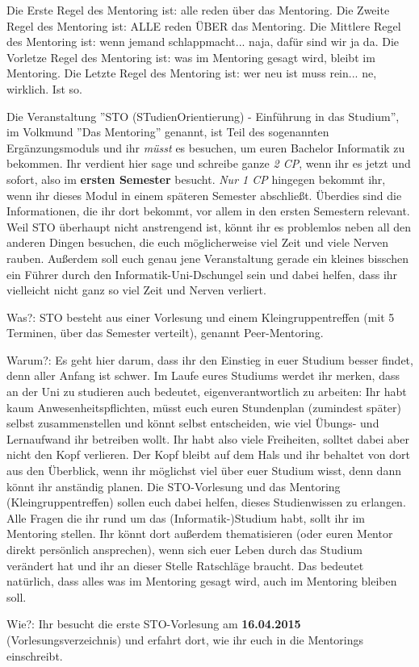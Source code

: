 \spaltenanfang
Die Erste Regel des Mentoring ist: alle reden über das Mentoring.
Die Zweite Regel des Mentoring ist: ALLE reden ÜBER das Mentoring.
Die Mittlere Regel des Mentoring ist: wenn jemand schlappmacht... naja, dafür sind wir ja da.
Die Vorletze Regel des Mentoring ist: was im Mentoring gesagt wird, bleibt im Mentoring.
Die Letzte Regel des Mentoring ist: wer neu ist muss rein... ne, wirklich. Ist so.

Die Veranstaltung ''STO (STudienOrientierung) - Einführung in das Studium'', im Volkmund ''Das Mentoring'' genannt, ist Teil des sogenannten Ergänzungsmoduls und ihr \emph{müsst} es besuchen, um euren Bachelor Informatik zu bekommen. Ihr verdient hier sage und schreibe ganze \emph{2 CP}, wenn ihr es jetzt und sofort, also im \textbf{ersten Semester} besucht. \emph{Nur 1 CP} hingegen bekommt ihr, wenn ihr dieses Modul in einem späteren Semester abschließt. Überdies sind die Informationen, die ihr dort bekommt, vor allem in den ersten Semestern relevant. Weil STO überhaupt nicht anstrengend ist, könnt ihr es problemlos neben all den anderen Dingen besuchen, die euch möglicherweise viel Zeit und viele Nerven rauben. Außerdem soll euch genau jene Veranstaltung gerade ein kleines bisschen ein Führer durch den Informatik-Uni-Dschungel sein und dabei helfen, dass ihr vielleicht nicht ganz so viel Zeit und Nerven verliert. 

Was?: STO besteht aus einer Vorlesung und einem Kleingruppentreffen (mit 5 Terminen, über das Semester verteilt), genannt Peer-Mentoring. 

Warum?: Es geht hier darum, dass ihr den Einstieg in euer Studium besser findet, denn aller Anfang ist schwer. Im Laufe eures Studiums werdet ihr merken, dass an der Uni zu studieren auch bedeutet, eigenverantwortlich zu arbeiten: Ihr habt kaum Anwesenheitspflichten, müsst euch euren Stundenplan (zumindest später) selbst zusammenstellen und könnt selbst entscheiden, wie viel Übungs- und Lernaufwand ihr betreiben wollt. 
Ihr habt also viele Freiheiten, solltet dabei aber nicht den Kopf verlieren. Der Kopf bleibt auf dem Hals und ihr behaltet von dort aus den Überblick, wenn ihr möglichst viel über euer Studium wisst, denn dann könnt ihr anständig planen.
Die STO-Vorlesung und das Mentoring (Kleingruppentreffen) sollen euch dabei helfen, dieses Studienwissen zu erlangen. Alle Fragen die ihr rund um das (Informatik-)Studium habt, sollt ihr im Mentoring stellen. Ihr könnt dort außerdem thematisieren (oder euren Mentor direkt persönlich ansprechen), wenn sich euer Leben durch das Studium verändert hat und ihr an dieser Stelle Ratschläge braucht. Das bedeutet natürlich, dass alles was im Mentoring gesagt wird, auch im Mentoring bleiben soll.

Wie?: Ihr besucht die erste STO-Vorlesung am \textbf{16.04.2015} (Vorlesungsverzeichnis) und erfahrt dort, wie ihr euch in die Mentorings einschreibt.
\spaltenende
